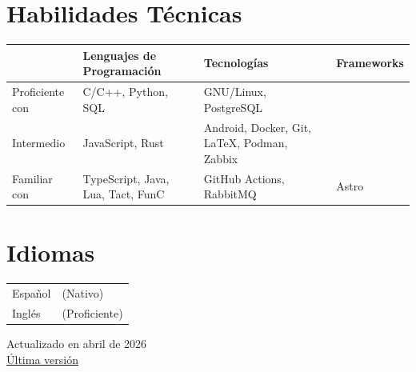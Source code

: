 \documentclass[a4paper,11pt]{article}
\begin{document}
\section{Habilidades Técnicas}
    \small
    \hspace{8pt}
    \begin{tabular}{l | l | l | l}
        & Lenguajes de Programación
        & Tecnologías
        & Frameworks
        \\ \hline

        Proficiente con
        & C/C++, Python, SQL
        & GNU/Linux, PostgreSQL
        &
        \\ \hline

        Intermedio
        & JavaScript, Rust
        & Android, Docker, Git, LaTeX, Podman, Zabbix
        &
        \\ \hline

        Familiar con
        & TypeScript, Java, Lua, Tact, FunC
        & GitHub Actions, RabbitMQ
        & Astro
    \end{tabular}

\section{Idiomas}
    \hspace{8pt}
    \small{\begin{tabular}{l l}
        Español & (Nativo) \\
        Inglés & (Proficiente) \\
    \end{tabular}}

\vspace*{\fill}
\begin{center}
  Actualizado en abril de 2026 \\
  \href{https://raw.githubusercontent.com/x93bd0/resume/main/es/resume.pdf}{\underline{Última versión}}
\end{center}
\end{document}
